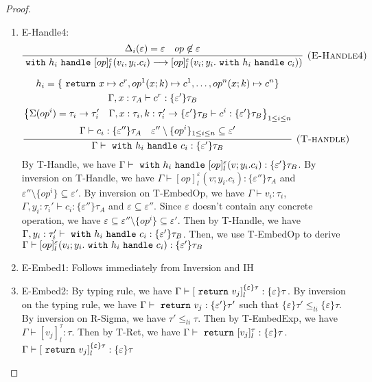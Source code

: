 \begin{proof}
\begin{enumerate}
\item E-Handle4:
$$
\infer[\textsc{(E-Handle4)}]
  {\m{with} h_i \m{handle} [op]^\varepsilon_l(v_i, y_i.c_i) \longrightarrow [op]^\varepsilon_l(v_i; y_i. \m{with} h_i \m{handle} c_i))}
  {\Delta_i(\varepsilon) = \varepsilon & op \not \in \varepsilon} 
$$

$$
\infer[\textsc{(T-handle)}]
  {\Gamma\vdash \m{with} h_i \m{handle} c_i: \{\varepsilon'\} \tau_B}
  {\begin{gathered}
  h_i = \{\m{return} x \mapsto c^r, op^1(x;k) \mapsto c^1, \dots, op^n(x;k) \mapsto c^n \}\\
  \Gamma, x: \tau_A \vdash c^r : \{\varepsilon'\}\tau_B \quad \\
  \left\{ \Sigma(op^i) = \tau_i \rightarrow \tau_i'  \quad \Gamma, x:\tau_i, k:\tau_i' \rightarrow \{\varepsilon'\}\tau_B \vdash c^i: \{\varepsilon'\}\tau_B    \right\}_{1 \leq i \leq n} \\
  \Gamma \vdash c_i : \{\varepsilon''\}\tau_A \quad \varepsilon'' \setminus \{op^i\}_{1 \leq i \leq n} \subseteq \varepsilon'
  \end{gathered}}
$$
By T-Handle, we have $\Gamma \vdash \ \texttt{with}\  h_i \ \texttt{handle}\  [op]^\varepsilon_l(v;y_i.c_i) :  \{\varepsilon'\}\tau_B$. By inversion on T-Handle, we have $\Gamma \vdash [op]^\varepsilon_l(v;y_i.c_i): \{\varepsilon''\}\tau_A$ and $\varepsilon'' \setminus \{op^i\} \subseteq \varepsilon'$. By inversion on T-EmbedOp, we have $\Gamma \vdash v_i: \tau_i$, $\Gamma, y_i:\tau_i' \vdash c_i : \{\varepsilon''\}\tau_A$ and $\varepsilon \subseteq \varepsilon''$. Since $\varepsilon$ doesn't contain any concrete operation, we have $\varepsilon \subseteq  \varepsilon'' \setminus \{op^i\} \subseteq \varepsilon' $. Then by T-Handle, we have $\Gamma, y_i: \tau_i' \vdash \ \texttt{with}\  h_i \ \texttt{handle}\  c_i : \{\varepsilon'\}\tau_B$. Then, we use T-EmbedOp to derive $\Gamma \vdash [op]^\varepsilon_l(v_i; y_i. \ \texttt{with}\  h_i \ \texttt{handle}\  c_i) : \{\varepsilon'\}\tau_B$


\item E-Embed1: Follows immediately from Inversion and IH
\item E-Embed2: By typing rule, we have $\Gamma \vdash [\ \texttt{return}\  v_j]^{\{\varepsilon\}\tau}_l :\{\varepsilon\}\tau$. By inversion on the typing rule, we have $\Gamma \vdash \ \texttt{return}\  v_j : \{\varepsilon'\}\tau'$ such that $\{\varepsilon\}\tau' \leq_{li} \{\varepsilon\}\tau$. By inversion on R-Sigma, we have $\tau' \leq_{li} \tau$. Then by T-EmbedExp, we have $\Gamma \vdash [v_j]^\tau_l : \tau$. Then by T-Ret, we have $\Gamma \vdash \ \texttt{return}\   [v_j]^\tau_l : \{\varepsilon\}\tau$. $\Gamma \vdash [\ \texttt{return}\  v_j]^{\{\varepsilon\}\tau}_l :\{\varepsilon\}\tau$


\end{enumerate}
\end{proof}
